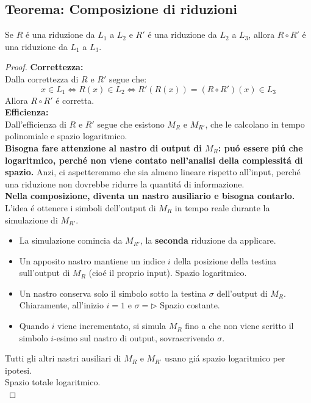 \subsection{Teorema: Composizione di riduzioni}
\label{teorema:composizione_riduzioni}
Se $R$ é una riduzione da $L_1$ a $L_2$ e $R'$ é una riduzione da $L_2$ a $L_3$, 
allora $R \circ R'$ é una riduzione da $L_1$ a $L_3$.
\begin{proof}
    \textbf{Correttezza:} \\
    Dalla correttezza di $R$ e $R'$ segue che:
    \[
    x \in L_1 \iff R(x) \in L_2 \iff R'(R(x)) = (R \circ R')(x) \in L_3
    \]
    Allora $R \circ R'$ é corretta. \\

    \textbf{Efficienza:} \\
    Dall'efficienza di $R$ e $R'$ segue che
    esistono $M_R$ e $M_{R'}$, che le calcolano 
    in tempo polinomiale e spazio logaritmico. \\

    \textbf{Bisogna fare attenzione al nastro di output di $M_R$:
    puó essere piú che logaritmico, perché non viene contato 
    nell'analisi della complessitá di spazio.}
    Anzi, ci aspetteremmo che sia almeno lineare rispetto all'input,
    perché una riduzione non dovrebbe ridurre la quantitá di informazione. \\
    \textbf{Nella composizione, diventa un nastro ausiliario e bisogna contarlo.}\\

    L'idea é ottenere i simboli dell'output di $M_R$ in tempo reale durante la simulazione di $M_{R'}$. \\
    \begin{itemize}
        \item La simulazione comincia da $M_{R'}$, la \textbf{seconda} riduzione da applicare.
        \item Un apposito nastro mantiene un indice $i$ della posizione della testina sull'output di $M_R$ (cioé il proprio input).
        \subitem Spazio logaritmico. 
        \item Un nastro conserva solo il simbolo sotto la testina $\sigma$ dell'output di $M_R$.
        \subitem Chiaramente, all'inizio $i=1$ e $\sigma = \triangleright$
        \subitem Spazio costante.
        \item Quando $i$ viene incrementato, si simula $M_R$ 
        fino a che non viene scritto il simbolo $i$-esimo sul nastro di output, 
        sovrascrivendo $\sigma$.
    \end{itemize}
    Tutti gli altri nastri ausiliari di $M_R$ e $M_{R'}$ usano giá spazio logaritmico per ipotesi. \\
    Spazio totale logaritmico. \\


\end{proof}
